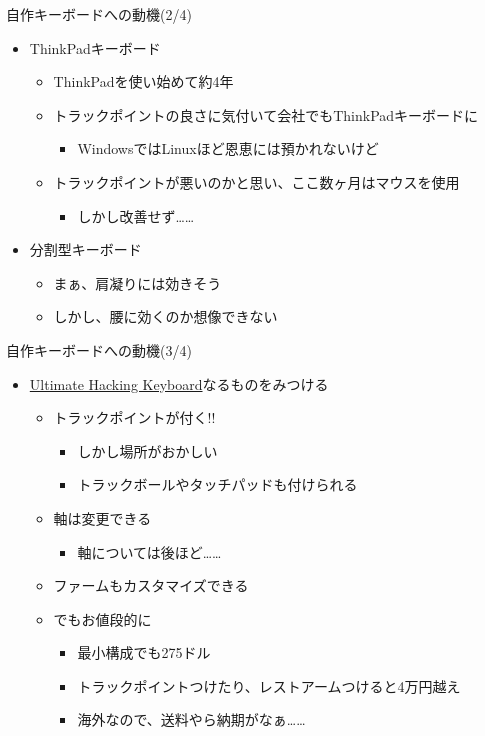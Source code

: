 \documentclass[cjk,dvipdfmx,10pt,compress,fragile%
hyperref={bookmarks=true,bookmarksnumbered=true,bookmarksopen=false,%
colorlinks=false,%
pdftitle={第 134 回 関西 Debian 勉強会},%
pdfauthor={小林},%
pdfsubject={資料},%
}]{beamer}
\begin{document}
\begin{frame}[fragile,t]{自作キーボードへの動機(2/4)}
 \begin{itemize}
  \item ThinkPadキーボード
	\begin{itemize}
	 \item ThinkPadを使い始めて約4年
	 \item トラックポイントの良さに気付いて会社でもThinkPadキーボードに
	       \begin{itemize}
		\item WindowsではLinuxほど恩恵には預かれないけど
	       \end{itemize}
	 \item トラックポイントが悪いのかと思い、ここ数ヶ月はマウスを使用
	       \begin{itemize}
		\item しかし改善せず……
	       \end{itemize}
	\end{itemize}
	\pause
  \item 分割型キーボード
	\begin{itemize}
	 \item まぁ、肩凝りには効きそう
	 \item しかし、腰に効くのか想像できない
	\end{itemize}
 \end{itemize}
\end{frame}

\begin{frame}[fragile,t]{自作キーボードへの動機(3/4)}
 \begin{itemize}
  \item \href{https://ultimatehackingkeyboard.com/}{Ultimate Hacking Keyboard}なるものをみつける
	\begin{itemize}
	 \item トラックポイントが付く!!
	       \begin{itemize}
		\item しかし場所がおかしい
		\item トラックボールやタッチパッドも付けられる
	       \end{itemize}
	 \item 軸は変更できる
	       \begin{itemize}
		\item 軸については後ほど……
	       \end{itemize}
	 \item ファームもカスタマイズできる
	 \item でもお値段的に
	       \begin{itemize}
		\item 最小構成でも275ドル
		\item トラックポイントつけたり、レストアームつけると4万円越え
		\item 海外なので、送料やら納期がなぁ……
	       \end{itemize}
	\end{itemize}
 \end{itemize}
\end{frame}
\end{document}
